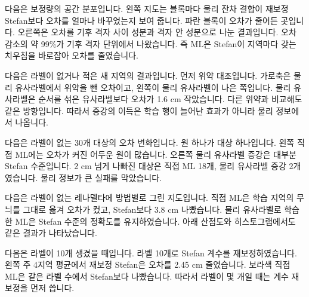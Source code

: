
다음은 보정량의 공간 분포입니다. 왼쪽 지도는 블록마다 물리 잔차 결합이 재보정 Stefan보다 오차를 얼마나 바꾸었는지 보여 줍니다. 파란 블록이 오차가 줄어든 곳입니다. 오른쪽은 오차를 기후 격자 사이 성분과 격자 안 성분으로 나눈 결과입니다. 오차 감소의 약 99\%가 기후 격자 단위에서 나왔습니다. 즉 ML은 Stefan이 지역마다 갖는 치우침을 바로잡아 오차를 줄였습니다.



다음은 라벨이 없거나 적은 새 지역의 결과입니다. 먼저 위약 대조입니다. 가로축은 물리 유사라벨에서 위약을 뺀 오차이고, 왼쪽이 물리 유사라벨이 나은 쪽입니다. 물리 유사라벨은 순서를 섞은 유사라벨보다 오차가 1.6 cm 작았습니다. 다른 위약과 비교해도 같은 방향입니다. 따라서 증강의 이득은 학습 행이 늘어난 효과가 아니라 물리 정보에서 나옵니다.



다음은 라벨이 없는 30개 대상의 오차 변화입니다. 원 하나가 대상 하나입니다. 왼쪽 직접 ML에는 오차가 커진 어두운 원이 많습니다. 오른쪽 물리 유사라벨 증강은 대부분 Stefan 수준입니다. 2 cm 넘게 나빠진 대상은 직접 ML 18개, 물리 유사라벨 증강 2개였습니다. 물리 정보가 큰 실패를 막았습니다.



다음은 라벨이 없는 레나델타에 방법별로 그린 지도입니다. 직접 ML은 학습 지역의 무늬를 그대로 옮겨 오차가 컸고, Stefan보다 3.8 cm 나빴습니다. 물리 유사라벨로 학습한 ML은 Stefan 수준의 정확도를 유지하였습니다. 아래 산점도와 히스토그램에서도 같은 결과가 나타났습니다.



다음은 라벨이 10개 생겼을 때입니다. 라벨 10개로 Stefan 계수를 재보정하였습니다. 왼쪽 주 4지역 평균에서 재보정 Stefan은 오차를 2.45 cm 줄였습니다. 보라색 직접 ML은 같은 라벨 수에서 Stefan보다 나빴습니다. 따라서 라벨이 몇 개일 때는 계수 재보정을 먼저 씁니다.


